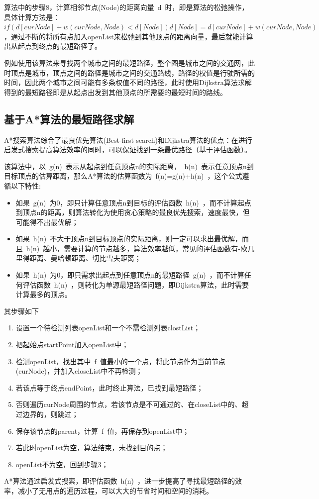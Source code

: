 \par 算法中的步骤8，计算相邻节点(Node)的距离向量~d~时，即是算法的松弛操作，具体计算方法是：$if (d[curNode] + w(curNode, Node) < d[Node]) d[Node] = d[curNode] + w(curNode, Node)$，通过不断的将所有点加入openList来松弛到其他顶点的距离向量，最后就能计算出从起点到终点的最短路径了。
\par 例如使用该算法来寻找两个城市之间的最短路径，整个图是城市之间的交通网，此时顶点是城市，顶点之间的路径是城市之间的交通路线，路径的权值是行驶所需的时间，因此两个城市之间可能有多条权值不同的路径，此时使用Dijkstra算法求解得到的最短路径即是从起点出发到其他顶点的所需要的最短时间的路线。
\subsection{基于A*算法的最短路径求解}
\par A*搜索算法综合了最良优先算法(Best-first search)和Dijkstra算法的优点：在进行启发式搜索提高算法效率的同时，可以保证找到一条最优路径（基于评估函数）。
\par 该算法中，以~g(n)~表示从起点到任意顶点n的实际距离，~h(n)~表示任意顶点n到目标顶点的估算距离，那么A*算法的估算函数为~f(n)=g(n)+h(n)~，这个公式遵循以下特性:
\begin{itemize}
    \item 如果~g(n)~为0，即只计算任意顶点n到目标的评估函数~h(n)~，而不计算起点到顶点n的距离，则算法转化为使用贪心策略的最良优先搜索，速度最快，但可能得不出最优解；
    \item 如果~h(n)~不大于顶点n到目标顶点的实际距离，则一定可以求出最优解，而且~h(n)~越小，需要计算的节点越多，算法效率越低，常见的评估函数有-欧几里得距离、曼哈顿距离、切比雪夫距离；
    \item 如果~h(n)~为0，即只需求出起点到任意顶点n的最短路径~g(n)~，而不计算任何评估函数~h(n)~，则转化为单源最短路径问题，即Dijkstra算法，此时需要计算最多的顶点。
\end{itemize}
\par 其步骤如下
\begin{enumerate}
    \item 设置一个待检测列表openList和一个不需检测列表clostList；
    \item 把起始点startPoint加入openList中；
    \item 检测openList，找出其中~f~值最小的一个点，将此节点作为当前节点(curNode)，并加入closeList中不再检测；
    \item 若该点等于终点endPoint，此时终止算法，已找到最短路径；
    \item 否则遍历curNode周围的节点，若该节点是不可通过的、在closeList中的、超过边界的，则跳过；
    \item 保存该节点的parent，计算~f~值，再保存到openList中；
    \item 若此时openList为空，算法结束，未找到目的点；
    \item openList不为空，回到步骤3；
\end{enumerate}
\par A*算法通过启发式搜索，即评估函数~h(n)~，进一步提高了寻找最短路径的效率，减小了无用点的遍历过程，可以大大的节省时间和空间的消耗。
